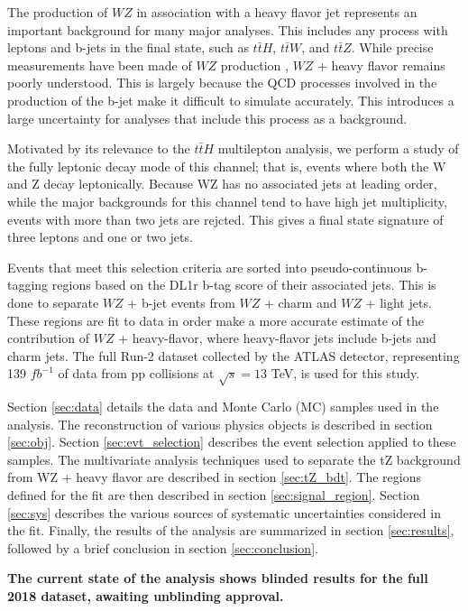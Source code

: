 
The production of $WZ$ in association with a heavy flavor jet represents an important background for many major analyses. This includes any process with leptons and b-jets in the final state, such as $t\bar{t}H$, $t\bar{t}W$, and $t\bar{t}Z$. While precise measurements have been made of $WZ$ production \cite{WZ_36}, $WZ$ + heavy flavor remains poorly understood. This is largely because the QCD processes involved in the production of the b-jet make it difficult to simulate accurately. This introduces a large uncertainty for analyses that include this process as a background.  

Motivated by its relevance to the $t\bar{t}H$ multilepton analysis, we perform a study of the fully leptonic decay mode of this channel; that is, events where both the W and Z decay leptonically. Because WZ has no associated jets at leading order, while the major backgrounds for this channel tend to have high jet multiplicity, events with more than two jets are rejcted. This gives a final state signature of three leptons and one or two jets.

Events that meet this selection criteria are sorted into pseudo-continuous b-tagging regions based on the DL1r b-tag score of their associated jets. This is done to separate $WZ$ + b-jet events from $WZ$ + charm and $WZ$ + light jets. These regions are fit to data in order make a more accurate estimate of the contribution of $WZ$ + heavy-flavor, where heavy-flavor jets include b-jets and charm jets. The full Run-2 dataset collected by the ATLAS detector, representing 139 $fb^{-1}$ of data from pp collisions at $\sqrt{s} = 13$ TeV, is used for this study.

Section \ref{sec:data} details the data and Monte Carlo (MC) samples used in the analysis. The reconstruction of various physics objects is described in section \ref{sec:obj}. Section \ref{sec:evt_selection} describes the event selection applied to these samples. The multivariate analysis techniques used to separate the tZ background from WZ + heavy flavor are described in section \ref{sec:tZ_bdt}. The regions defined for the fit are then described in section \ref{sec:signal_region}. Section \ref{sec:sys} describes the various sources of systematic uncertainties considered in the fit. Finally, the results of the analysis are summarized in section \ref{sec:results}, followed by a brief conclusion in section \ref{sec:conclusion}.

\textbf{The current state of the analysis shows blinded results for the full 2018 dataset, awaiting unblinding approval.}
